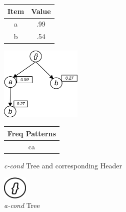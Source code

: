 \begin{figure}
\begin{minipage}{0.30\textwidth}
  \centering
	\begin{center}
	\begin{tabular}{ |c|c| } 
 	\hline
 		Item&Value\\ \hline\hline
 		a &  .99  	\\ \hline
 		b &  .54   	\\ \hline
\end{tabular}
\end{center}  
\end{minipage}
  \hfill
\begin{minipage}{0.29\textwidth}
  \centering
  \hfill
  \includegraphics[width=.8\textwidth, height=3.5cm]{images/C_COND.jpg}
  \hfill  
\end{minipage}
\hfill
\begin{minipage}{0.30\textwidth}
  \centering  
	\begin{center}
	\begin{tabular}{ |c| } 
 	\hline
 		Freq Patterns \\ \hline\hline
 		ca  	\\ \hline
 		
\end{tabular}
\end{center}   
\end{minipage}
\caption{\emph{c-cond} Tree and corresponding Header}
\label{figure:c_cond}
\end{figure}
\begin{figure}
\centering
  \includegraphics[width=.10\textwidth, height=1.1cm]{images/A_COND.jpg}
\caption{\emph{a-cond} Tree}
\label{figure:a_cond}
\end{figure}

%

